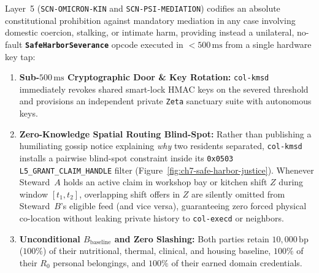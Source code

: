 Layer~5 (\texttt{SCN-OMICRON-KIN} and \texttt{SCN-PSI-MEDIATION}) codifies an absolute
constitutional prohibition against mandatory mediation in any case involving domestic coercion,
stalking, or intimate harm, providing instead a unilateral, no-fault \textbf{\texttt{SafeHarborSeverance}}
opcode executed in $< 500\,\mathrm{ms}$ from a single hardware key tap:
\begin{enumerate}
    \item \textbf{Sub-$500\,\mathrm{ms}$ Cryptographic Door \& Key Rotation:} \texttt{col-kmsd}
    immediately revokes shared smart-lock HMAC keys on the severed threshold and provisions an
    independent private \texttt{Zeta} sanctuary suite with autonomous keys.
    \item \textbf{Zero-Knowledge Spatial Routing Blind-Spot:} Rather than publishing a humiliating
    gossip notice explaining \textit{why} two residents separated, \texttt{col-kmsd} installs a
    pairwise blind-spot constraint inside its \texttt{0x0503 L5\_GRANT\_CLAIM\_HANDLE} filter
    (Figure~\ref{fig:ch7-safe-harbor-justice}). Whenever Steward~$A$ holds an active claim in
    workshop bay or kitchen shift $Z$ during window $[t_1, t_2]$, overlapping shift offers in $Z$
    are silently omitted from Steward~$B$'s eligible feed (and vice versa), guaranteeing zero
    forced physical co-location without leaking private history to \texttt{col-execd} or neighbors.
    \item \textbf{Unconditional $B_{\mathrm{baseline}}$ and Zero Slashing:} Both parties retain
    $10{,}000\,\mathrm{bp}$ ($100\%$) of their nutritional, thermal, clinical, and housing baseline,
    $100\%$ of their $R_0$ personal belongings, and $100\%$ of their earned domain credentials.
\end{enumerate}

